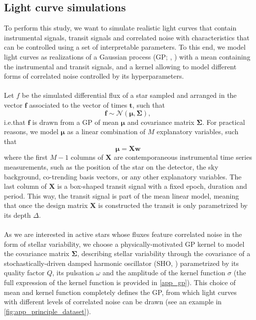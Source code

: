 \documentclass[modern]{aastex631}
\begin{document}
\subsection{Light curve simulations}\label{light_curves_simulations}
To perform this study, we want to simulate realistic light curves that contain instrumental signals, transit signals and correlated noise with characteristics that can be controlled using a set of interpretable parameters. To this end, we model light curves as realizations of a Gaussian process (GP; \citealt{Rasmussen2005}, \citealt{Aigrain2023}) with a mean containing the instrumental and transit signals, and a kernel allowing to model different forms of correlated noise controlled by its hyperparameters.\\\\
Let $f$ be the simulated differential flux of a star sampled and arranged in the vector $\bm{f}$ associated to the vector of times $\bm{t}$, such that
\begin{equation*}
    \bm{f} \sim \mathcal{N}(\bm{\mu}, \bm{\Sigma}),
\end{equation*}
i.e.\;that $\bm{f}$ is drawn from a GP of mean $\bm{\mu}$ and covariance matrix $\bm{\Sigma}$. For practical reasons, we model $\bm{\mu}$ as a linear combination of $M$ explanatory variables, such that
\begin{equation}\label{eq:linear_model}
    \bm{\mu} = \bm{X w}
\end{equation}
where the first $M-1$ columns of $\bm{X}$ are contemporaneous instrumental time series measurements, such as the position of the star on the detector, the sky background, co-trending basis vectors, or any other explanatory variables. The last column of $\bm{X}$ is a box-shaped transit signal with a fixed epoch, duration and period. This way, the transit signal is part of the mean linear model, meaning that once the design matrix $\bm{X}$ is constructed the transit is only parametrized by its depth $\Delta$.\\\\
As we are interested in active stars whose fluxes feature correlated noise in the form of stellar variability, we choose a physically-motivated GP kernel to model the covariance matrix $\bm{\Sigma}$, describing stellar variability through the covariance of a stochastically-driven damped harmonic oscillator (SHO, \citealt{celerite, celerite2}) parametrized by its quality factor $Q$, its pulsation $\omega$ and the amplitude of the kernel function $\sigma$ (the full expression of the kernel function is provided in \autoref{app_gp}). This choice of mean and kernel function completely defines the GP, from which light curves with different levels of correlated noise can be drawn (see an example in \autoref{fig:app_principle_dataset}).
\end{document}
